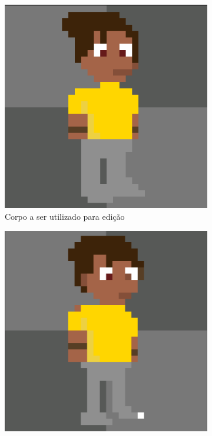 \begin{figure}[htbp]
    \centering
    \caption{\small Ajuste fino nos resultados da rotação de 45 graus}
    \label{fig:pixelLabAjusteFino2}
    \begin{subfigure}{0.32\linewidth}
        \centering
        \includegraphics[width=1\linewidth]{figs/pixelLab/dia2/rot45res3.PNG}
        \caption{\small Corpo a ser utilizado para edição}
        \label{fig:pixelLabAjusteFino2a}
    \end{subfigure}
    \begin{subfigure}{0.32\linewidth}
        \centering
        \includegraphics[width=1\linewidth]{figs/pixelLab/dia2/rot45res4.PNG}

\end{subfigure}
\end{figure}
